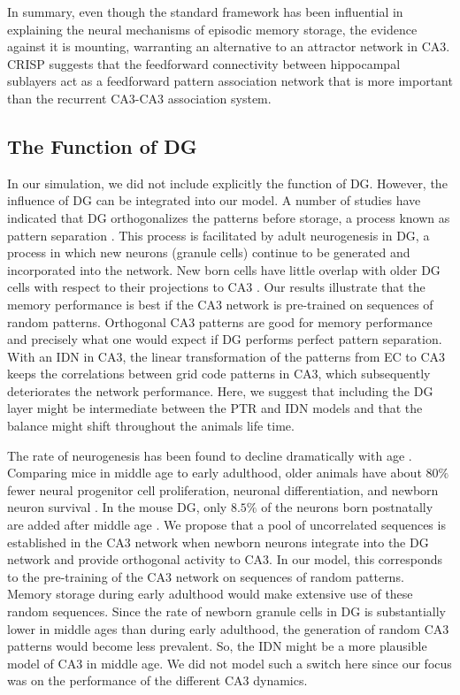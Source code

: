 \documentclass[utf8]{frontiersSCNS} %
\begin{document}
In summary, even though the standard framework has been influential in explaining the neural mechanisms of episodic memory storage, the evidence against it is mounting, warranting an alternative to an attractor network in CA3. CRISP suggests that the feedforward connectivity between hippocampal sublayers act as a feedforward pattern association network that is more important than the recurrent CA3-CA3 association system. 



\subsection{The Function of DG}

In our simulation, we did not include explicitly the function of DG. However, the influence of DG can be integrated into our model. A number of studies have indicated that DG orthogonalizes the patterns before storage, a process known as pattern separation \citep{mcnaughton1987hippocampal, o1994hippocampal, marr1991simple, treves2008mammalian}. This process is facilitated by adult neurogenesis in DG, a process in which new neurons (granule cells) continue to be generated and incorporated into the network. New born cells have little overlap with older DG cells with respect to their projections to CA3 \citep{becker2005computational, wiskott2006functional, aimone2009computational}. Our results illustrate that the memory performance is best if the CA3 network is pre-trained on sequences of random patterns. Orthogonal CA3 patterns are good for memory performance and precisely what one would expect if DG performs perfect pattern separation. With an IDN in CA3, the linear transformation of the patterns from EC to CA3 keeps the correlations between grid code patterns in CA3, which subsequently deteriorates the network performance. Here, we suggest that including the DG layer might be intermediate between the PTR and IDN models and that the balance might shift throughout the animals life time. 

The rate of neurogenesis has been found to decline dramatically with age \citep{ kuhn1996neurogenesis, klempin2007adult}. Comparing mice in middle age to early adulthood, older animals have about $80\%$ fewer neural progenitor cell proliferation, neuronal differentiation, and newborn neuron survival \citep{kuipers2015changes}. In the mouse DG, only $8.5\%$ of the neurons born postnatally are added after middle age \citep{lazic2012modeling}. We propose that a pool of uncorrelated sequences is established in the CA3 network when newborn neurons integrate into the DG network and provide orthogonal activity to CA3. In our model, this corresponds to the pre-training of the CA3 network on sequences of random patterns. Memory storage during early adulthood would make extensive use of these random sequences. Since the rate of newborn granule cells in DG is substantially lower in middle ages than during early adulthood, the generation of random CA3 patterns would become less prevalent. So, the IDN might be a more plausible model of CA3 in middle age. We did not model such a switch here since our focus was on the performance of the different CA3 dynamics.
\end{document}
